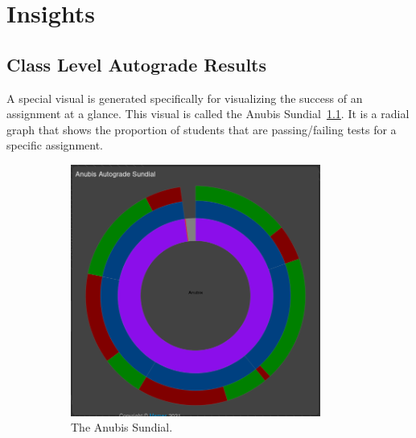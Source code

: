 \chapter{Insights}\label{ch:insights}


\section{Class Level Autograde Results}\label{sec:class-level-results}

A special visual is generated specifically for visualizing the success of an assignment at a glance.
This visual is called the Anubis Sundial~\ref{fig:autograde-sundial-1}.
It is a radial graph that shows the proportion of students that are passing/failing tests
for a specific assignment.

\begin{figure}[ht]
    \centering
    \begin{subfigure}{0.5\textwidth}
        \centering
        \includegraphics[width=0.9\textwidth]{figures/sundial-1}
        \caption{The Anubis Sundial.\label{fig:autograde-sundial-1} }
    \end{subfigure}%
    \begin{subfigure}{0.5\textwidth}
        \centering

\end{subfigure}
\end{figure}
